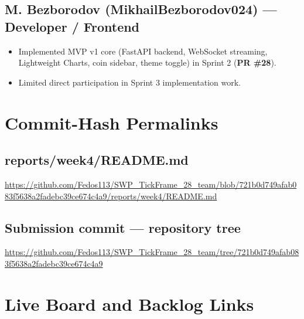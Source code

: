 \documentclass[11pt,a4paper]{article}
\begin{document}
\subsection{M. Bezborodov (MikhailBezborodov024) --- Developer / Frontend}
\begin{itemize}[leftmargin=*]
    \item Implemented MVP v1 core (FastAPI backend, WebSocket streaming, Lightweight Charts, coin sidebar, theme toggle) in Sprint 2 (\textbf{PR \#28}).
    \item Limited direct participation in Sprint 3 implementation work.
\end{itemize}

\section{Commit-Hash Permalinks}

\subsection{reports/week4/README.md}
\url{https://github.com/Fedos113/SWP_TickFrame_28_team/blob/721b0d749afab083f5638a2fadebc39ce674c4a9/reports/week4/README.md}

\subsection{Submission commit --- repository tree}
\url{https://github.com/Fedos113/SWP_TickFrame_28_team/tree/721b0d749afab083f5638a2fadebc39ce674c4a9}

\section{Live Board and Backlog Links}
\end{document}
